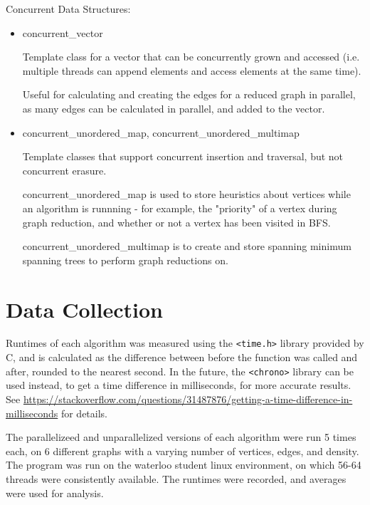 \documentclass[12pt]{article}
\begin{document}
Concurrent Data Structures:
\begin{itemize}
  \item concurrent\_vector

  Template class for a vector that can be concurrently grown and accessed (i.e. multiple threads can append elements and access elements at the same time). 

  Useful for calculating and creating the edges for a reduced graph in parallel, as many edges can be calculated in parallel, and added to the vector.

  \item concurrent\_unordered\_map, concurrent\_unordered\_multimap

  Template classes that support concurrent insertion and traversal, but not concurrent erasure. 

  concurrent\_unordered\_map is used to store heuristics about vertices while an algorithm is runnning - for example, the "priority" of a vertex during graph reduction, and whether or not a vertex has been visited in BFS.

  concurrent\_unordered\_multimap is to create and store spanning minimum spanning trees to perform graph reductions on.

\end{itemize}

\section{Data Collection}

Runtimes of each algorithm was measured using the \texttt{<time.h>} library provided by C, and is calculated as the difference between before the function was called and after, rounded to the nearest second. In the future, the \texttt{<chrono>} library can be used instead, to get a time difference in milliseconds, for more accurate results. See \url{https://stackoverflow.com/questions/31487876/getting-a-time-difference-in-milliseconds} for details.

The parallelizeed and unparallelized versions of each algorithm were run 5 times each, on 6 different graphs with a varying number of vertices, edges, and density. The program was run on the waterloo student linux environment, on which 56-64 threads were consistently available. The runtimes were recorded, and averages were used for analysis.
\end{document}
